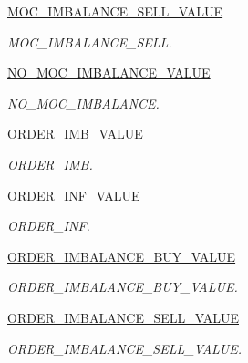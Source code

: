 \begin{CompactItemize}
\hyperlink{classWombat_1_1MamdaOrderImbalanceType_1d6586915356b2aa4c6931591f172c148e4dbc7fb6d8821b2835a068e58e1eaa}{MOC\_\-IMBALANCE\_\-SELL\_\-VALUE}
\begin{CompactList}\small\item\em MOC\_\-IMBALANCE\_\-SELL. \item\end{CompactList}\item 
\hyperlink{classWombat_1_1MamdaOrderImbalanceType_1d6586915356b2aa4c6931591f172c142ff26979e20d2b04aea2ebb10a34324c}{NO\_\-MOC\_\-IMBALANCE\_\-VALUE}
\begin{CompactList}\small\item\em NO\_\-MOC\_\-IMBALANCE. \item\end{CompactList}\item 
\hyperlink{classWombat_1_1MamdaOrderImbalanceType_1d6586915356b2aa4c6931591f172c1473cc791896fae438252f0c293d8ddeca}{ORDER\_\-IMB\_\-VALUE}
\begin{CompactList}\small\item\em ORDER\_\-IMB. \item\end{CompactList}\item 
\hyperlink{classWombat_1_1MamdaOrderImbalanceType_1d6586915356b2aa4c6931591f172c14e27d761635e6a705c93273d70c9a68e1}{ORDER\_\-INF\_\-VALUE}
\begin{CompactList}\small\item\em ORDER\_\-INF. \item\end{CompactList}\item 
\hyperlink{classWombat_1_1MamdaOrderImbalanceType_1d6586915356b2aa4c6931591f172c14fdc23112b702f43eed612464e5bbedf3}{ORDER\_\-IMBALANCE\_\-BUY\_\-VALUE}
\begin{CompactList}\small\item\em ORDER\_\-IMBALANCE\_\-BUY\_\-VALUE. \item\end{CompactList}\item 
\hyperlink{classWombat_1_1MamdaOrderImbalanceType_1d6586915356b2aa4c6931591f172c14e06b6e6ef1d914936904fa3b162c301d}{ORDER\_\-IMBALANCE\_\-SELL\_\-VALUE}
\begin{CompactList}\small\item\em ORDER\_\-IMBALANCE\_\-SELL\_\-VALUE. \item\end{CompactList}\item 

\end{CompactItemize}
